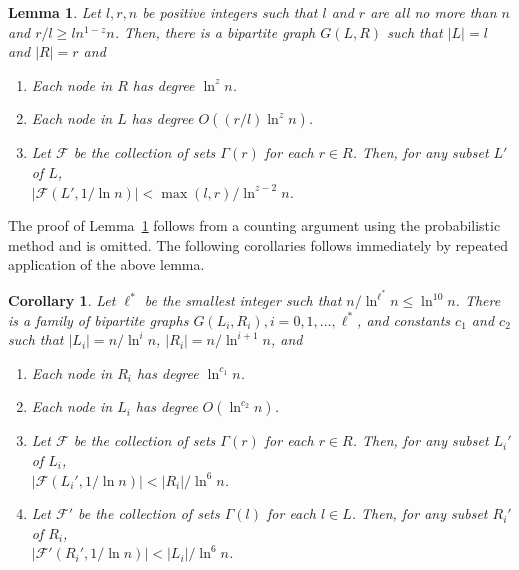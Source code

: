 \documentclass[11pt,letter]{article}
\theoremstyle{mytheoremstyle}
\newtheorem{lemma}{Lemma}
\newtheorem{corollary}{Corollary}
\newcommand{\toplev}{\ell^*}
\begin{document}
\begin{lemma} \label{l:expander}
	Let $l,r,n$ be positive integers such that $l$ and $r$ are all no more than $n$ and $r/l \geq ln^{1-z} n$. Then, there is a bipartite graph $G(L,R)$ such that $|L| = l$ and $|R| = r$ and
	
	\begin{enumerate}
		\item Each node in $R$ has degree $\ln^{z} n$.
		\item Each node in $L$ has degree $O((r/l) \ln^{z}n)$.
		\item Let $\mathcal{F}$ be the collection of sets $\Gamma(r)$ for each $r \in R$. Then, for any subset $L'$ of $L$,\\
		$|\mathcal{F}(L', 1/\ln n )| < \max(l,r)/ \ln^{z-2} n$.
	\end{enumerate}
	
\end{lemma}

The proof of Lemma~\ref{l:expander} follows from a counting argument using the probabilistic method and is omitted.
The following corollaries follows immediately by repeated application of the above lemma.

\begin{corollary} \label{l:expander s-node connection}
	Let $\toplev$ be the smallest integer such that $n/\ln^{\toplev} n \le \ln^{10} n$.
	There is a family of bipartite graphs $G(L_i, R_i), i=0,1,\ldots,
	\toplev$, and constants $c_1$ and $c_2$ such that $|L_{i}| =
	n/\ln^{i} n$, $|R_{i}|=n/\ln^{i+1} n$, and
	
	\begin{enumerate}		
		\item Each node in $R_i$ has degree $\ln^{c_1} n$.
		
		\item Each node in $L_{i}$ has degree $O(\ln^{c_2} n)$.
		
		\item Let $\mathcal{F}$ be the collection of sets $\Gamma(r)$ for each $r \in R$. Then, for any subset $L_i'$ of $L_i$,\\
		$|\mathcal{F}(L_i', 1/\ln n )| < |R_i|/\ln^{6} n$.
		
		\item Let $\mathcal{F'}$ be the collection of sets $\Gamma(l)$ for each $l \in L$. Then, for any subset $R_i'$ of $R_i$,\\
		$|\mathcal{F'}(R_i', 1/\ln n )| < |L_i|/\ln^{6} n$.		
	\end{enumerate}
	
\end{corollary}
\end{document}
